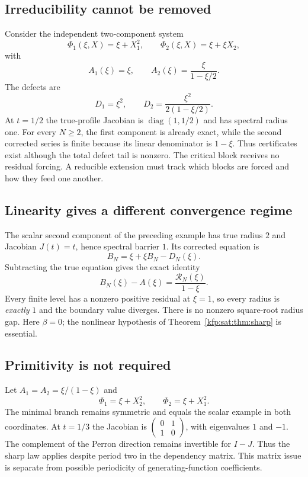 \documentclass[11pt,a4paper]{article}
\theoremstyle{definition}
\theoremstyle{remark}
\newcommand{\satR}{\mathcal R}
\begin{document}
\subsection{Irreducibility cannot be removed}
Consider the independent two-component system
\[
 \Phi_1(\xi,X)=\xi+X_1^2,\qquad
 \Phi_2(\xi,X)=\xi+\xi X_2,
\]
with
\[
 A_1(\xi)=\xi,\qquad A_2(\xi)=\frac \xi{1-\xi/2}.
\]
The defects are
\[
 D_1=\xi^2,\qquad D_2=\frac{\xi^2}{2(1-\xi/2)}.
\]
At $t=1/2$ the true-profile Jacobian is
$\operatorname{diag}(1,1/2)$ and has spectral radius one. For every
$N\ge2$, the first component is already exact, while the second corrected
series is finite because its linear denominator is $1-\xi$. Thus
certificates exist although the total defect tail is nonzero. The critical
block receives no residual forcing. A reducible extension must track
which blocks are forced and how they feed one another.

\subsection{Linearity gives a different convergence regime}
The scalar second component of the preceding example has true radius $2$
and Jacobian $J(t)=t$, hence spectral barrier $1$. Its corrected equation is
\[
 B_N=\xi+\xi B_N-D_N(\xi).
\]
Subtracting the true equation gives the exact identity
\[
 B_N(\xi)-A(\xi)=\frac{\satR_N(\xi)}{1-\xi}.
\]
Every finite level has a nonzero positive residual at $\xi=1$, so every
radius is \emph{exactly} $1$ and the boundary value diverges. There is no
nonzero square-root radius gap. Here $\beta=0$; the nonlinear hypothesis
of Theorem~\ref{kfp:sat:thm:sharp} is essential.

\subsection{Primitivity is not required}
Let $A_1=A_2=\xi/(1-\xi)$ and
\[
 \Phi_1=\xi+X_2^2,\qquad \Phi_2=\xi+X_1^2.
\]
The minimal branch remains symmetric and equals the scalar example in
both coordinates. At $t=1/3$ the Jacobian is
$\left(\begin{smallmatrix}0&1\\1&0\end{smallmatrix}\right)$, with
eigenvalues $1$ and $-1$. The complement of the Perron direction remains
invertible for $I-J$. Thus the sharp law applies despite period two in
the dependency matrix. This matrix issue is separate from possible
periodicity of generating-function coefficients.
\end{document}
